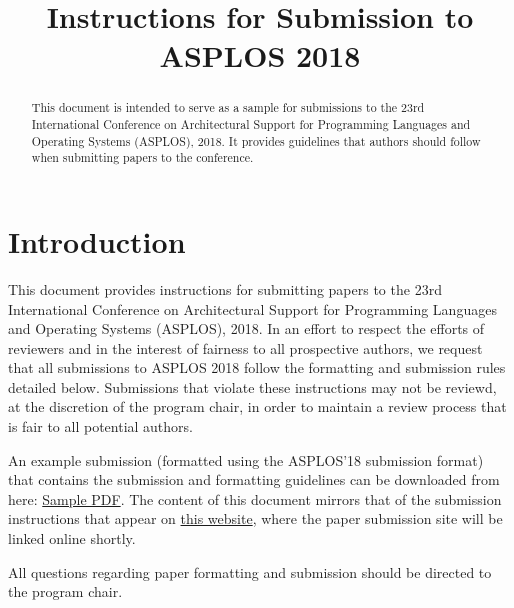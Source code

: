 \documentclass[pageno]{jpaper}
\begin{document}
\title{
Instructions for Submission to ASPLOS 2018}

\date{}
\maketitle

\thispagestyle{empty}

\begin{abstract}

This document is intended to serve as a sample for submissions to the
23rd International Conference on Architectural Support for Programming
Languages and Operating Systems (ASPLOS), 2018.  It provides
guidelines that authors should follow when submitting papers to the
conference.

\end{abstract}

\section{Introduction}

This document provides instructions for submitting papers to the 23rd
International Conference on Architectural Support for Programming
Languages and Operating Systems (ASPLOS), 2018.  In an effort to
respect the efforts of reviewers and in the interest of fairness to
all prospective authors, we request that all submissions to ASPLOS
2018 follow the formatting and submission rules detailed below.
Submissions that violate these instructions may not be reviewd, at the
discretion of the program chair, in order to maintain a review process
that is fair to all potential authors.

An example submission (formatted using the ASPLOS'18 submission
format) that contains the submission and formatting guidelines can be
downloaded from here:
\href{https://www.asplos2018.org/wp-content/uploads/2017/07/asplos18-template.pdf}{Sample PDF}. The content of
this document mirrors that of the submission instructions that appear
on \href{https://www.asplos2018.org/submissions/}{this
website}, where the paper submission site will be linked online
shortly.

All questions regarding paper formatting and submission should be directed
to the program chair.
\end{document}
